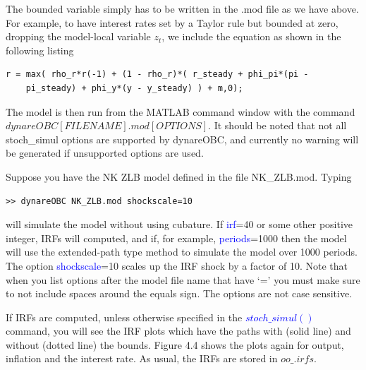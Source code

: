 \documentclass[cn,10pt,math=newtx,citestyle=gb7714-2015,bibstyle=gb7714-2015]{elegantbook}
\begin{document}
The bounded variable simply has to be written in the .mod file as we have above. For example, to have interest rates set by a Taylor rule but bounded at zero, dropping the model-local variable $z_t$, we include the equation as shown
in the following listing

\begin{lstlisting}[frame=shadowbox]
	r = max( rho_r*r(-1) + (1 - rho_r)*( r_steady + phi_pi*(pi -
	pi_steady) + phi_y*(y - y_steady) ) + m,0);
\end{lstlisting}

The model is then run from the MATLAB command window with the command \textbf{$dynareOBC [FILENAME].mod [OPTIONS]$}. It should be noted that not all stoch\_simul options are supported by dynareOBC, and currently no warning will be generated if unsupported options are used.

Suppose you have the NK ZLB model defined in the file NK\_ZLB.mod. Typing

\begin{lstlisting}[frame=shadowbox]
	>> dynareOBC NK_ZLB.mod shockscale=10
\end{lstlisting}

will simulate the model without using cubature. If \textcolor{blue}{irf}=40 or some other positive integer, IRFs will computed, and if, for example, \textcolor{blue}{periods}=1000 then the model will use the extended-path type method to simulate the model over 1000
periods. The option \textcolor{blue}{shockscale}=10 scales up the IRF shock by a factor of 10. Note that when you list options after the model file name that have ‘=’ you
must make sure to not include spaces around the equals sign. The options are not case sensitive.

If IRFs are computed, unless otherwise specified in the \textcolor{blue}{$stoch\_simul()$} command, you will see the IRF plots which have the paths with (solid line) and without (dotted line) the bounds. Figure 4.4 shows the plots again for output, inflation and the interest rate. As usual, the IRFs are stored in $oo\_.irfs$.
\end{document}
